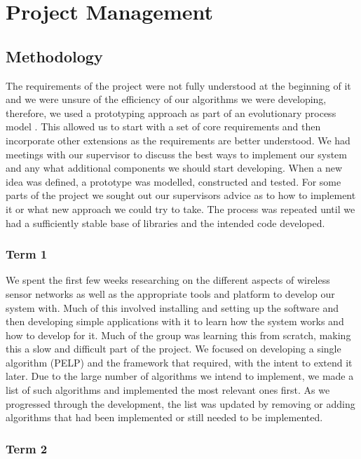 \section{Project Management}

\subsection{Methodology}

The requirements of the project were not fully understood at the beginning of it and we were unsure of the efficiency of our algorithms we were developing, therefore, we used a prototyping approach as part of an evolutionary process model \cite[p.~42--44]{pressman2010software}. This allowed us to start with a set of core requirements and then incorporate other extensions as the requirements are better understood. We had meetings with our supervisor to discuss the best ways to implement our system and any what additional components we should start developing. When a new idea was defined, a prototype was modelled, constructed and tested. For some parts of the project we sought out our supervisors advice as to how to implement it or what new approach we could try to take. The process was repeated until we had a sufficiently stable base of libraries and the intended code developed.

\subsubsection*{Term 1}

We spent the first few weeks researching on the different aspects of wireless sensor networks as well as the appropriate tools and platform to develop our system with. Much of this involved installing and setting up the software and then developing simple applications with it to learn how the system works and how to develop for it. Much of the group was learning this from scratch, making this a slow and difficult part of the project. We focused on developing a single algorithm (PELP) and the framework that required, with the intent to extend it later. Due to the large number of algorithms we intend to implement, we made a list of such algorithms and implemented the most relevant ones first. As we progressed through the development, the list was updated by removing or adding algorithms that had been implemented or still needed to be implemented.

\subsubsection*{Term 2}

